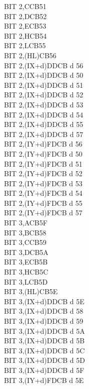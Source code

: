 \begin{multicols}{3}
{\begin{tabbing}
		BIT 2,C\>CB51\\
		BIT 2,D\>CB52\\
		BIT 2,E\>CB53\\
		BIT 2,H\>CB54\\
		BIT 2,L\>CB55\\
		BIT 2,(HL)\>CB56\\
		BIT 2,(IX+d)\>DDCB d 56\\
		BIT 2,(IX+d)\UNDOC\>DDCB d 50\\
		BIT 2,(IX+d)\UNDOC\>DDCB d 51\\
		BIT 2,(IX+d)\UNDOC\>DDCB d 52\\
		BIT 2,(IX+d)\UNDOC\>DDCB d 53\\
		BIT 2,(IX+d)\UNDOC\>DDCB d 54\\
		BIT 2,(IX+d)\UNDOC\>DDCB d 55\\
		BIT 2,(IX+d)\UNDOC\>DDCB d 57\\
		BIT 2,(IY+d)\>FDCB d 56\\
		BIT 2,(IY+d)\UNDOC\>FDCB d 50\\
		BIT 2,(IY+d)\UNDOC\>FDCB d 51\\
		BIT 2,(IY+d)\UNDOC\>FDCB d 52\\
		BIT 2,(IY+d)\UNDOC\>FDCB d 53\\
		BIT 2,(IY+d)\UNDOC\>FDCB d 54\\
		BIT 2,(IY+d)\UNDOC\>FDCB d 55\\
		BIT 2,(IY+d)\UNDOC\>FDCB d 57\\
		BIT 3,A\>CB5F\\
		BIT 3,B\>CB58\\
		BIT 3,C\>CB59\\
		BIT 3,D\>CB5A\\
		BIT 3,E\>CB5B\\
		BIT 3,H\>CB5C\\
		BIT 3,L\>CB5D\\
		BIT 3,(HL)\>CB5E\\
		BIT 3,(IX+d)\>DDCB d 5E\\
		BIT 3,(IX+d)\UNDOC\>DDCB d 58\\
		BIT 3,(IX+d)\UNDOC\>DDCB d 59\\
		BIT 3,(IX+d)\UNDOC\>DDCB d 5A\\
		BIT 3,(IX+d)\UNDOC\>DDCB d 5B\\
		BIT 3,(IX+d)\UNDOC\>DDCB d 5C\\
		BIT 3,(IX+d)\UNDOC\>DDCB d 5D\\
		BIT 3,(IX+d)\UNDOC\>DDCB d 5F\\
		BIT 3,(IY+d)\>FDCB d 5E\\

\end{tabbing}}
\end{multicols}
